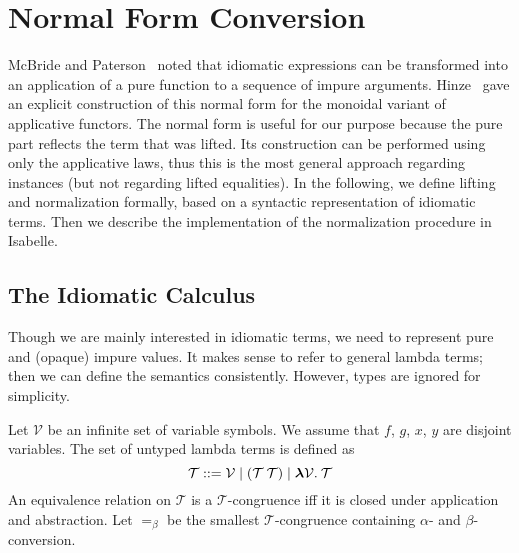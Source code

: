 \section{Normal Form Conversion}\label{sec:normal-form}

McBride and Paterson~\cite{mcbride08} noted that idiomatic expressions can
be transformed into an application of a pure function to a sequence of impure
arguments.
Hinze~\cite{hinze10} gave an explicit construction of this normal form for the
monoidal variant of applicative functors.
The normal form is useful for our purpose because the pure part reflects the
term that was lifted.
Its construction can be performed using only the applicative laws, thus this is
the most general approach regarding instances (but not regarding lifted
equalities).
In the following, we define lifting and normalization formally, based on a
syntactic representation of idiomatic terms.
Then we describe the implementation of the normalization procedure in Isabelle.

\subsection{The Idiomatic Calculus}\label{subsec:idiomatic-calculus}

Though we are mainly interested in idiomatic terms, we need to represent
pure and (opaque) impure values.
It makes sense to refer to general lambda terms;
then we can define the semantics consistently.
However, types are ignored for simplicity.

\begin{definition}
Let $\mathcal{V}$ be an infinite set of variable symbols.
We assume that $f$, $g$, $x$, $y$ are disjoint variables.
The set of untyped lambda terms is defined as
\begin{equation}
	\mathcal{T} ::= \mathcal{V} \mid (\mathcal{T} \> \mathcal{T}) \mid
		{\boldsymbol\lambda} \mathcal{V}.\>\mathcal{T}
\end{equation}
An equivalence relation on $\mathcal{T}$ is a $\mathcal{T}$-congruence iff it
is closed under application and abstraction.
Let $=_\beta$ be the smallest $\mathcal{T}$-congruence containing $\alpha$- and
$\beta$-conversion.
\end{definition}

